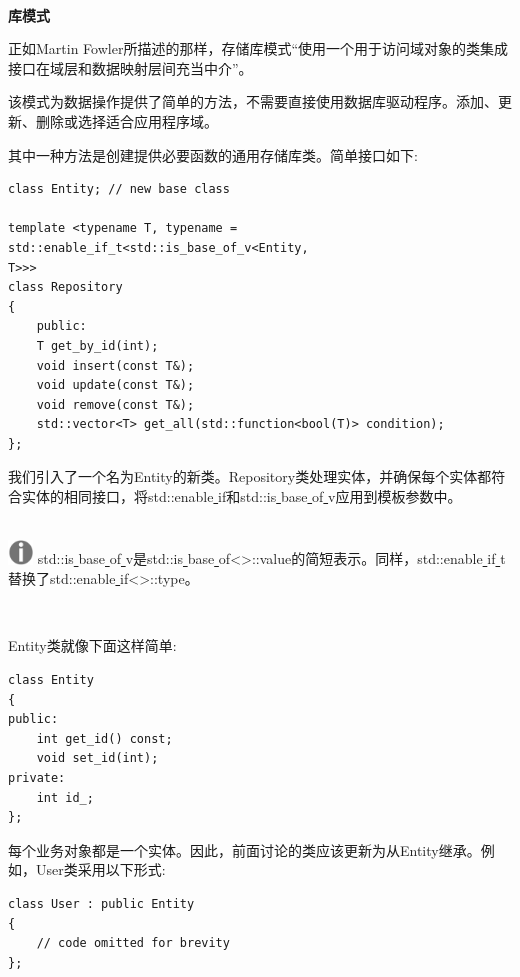 \noindent\textbf{}\ \par
\textbf{库模式} \ \par
正如Martin Fowler所描述的那样，存储库模式“使用一个用于访问域对象的类集成接口在域层和数据映射层间充当中介”。 \par
该模式为数据操作提供了简单的方法，不需要直接使用数据库驱动程序。添加、更新、删除或选择适合应用程序域。 \par
其中一种方法是创建提供必要函数的通用存储库类。简单接口如下: \par

\begin{lstlisting}[caption={}]
class Entity; // new base class

template <typename T, typename = std::enable_if_t<std::is_base_of_v<Entity,
T>>>
class Repository
{
	public:
	T get_by_id(int);
	void insert(const T&);
	void update(const T&);
	void remove(const T&);
	std::vector<T> get_all(std::function<bool(T)> condition);
};
\end{lstlisting}

我们引入了一个名为Entity的新类。Repository类处理实体，并确保每个实体都符合实体的相同接口，将std::enable\underline{ }if和std::is\underline{ }base\underline{ }of\underline{ }v应用到模板参数中。 \par

\hspace*{\fill} \\ %
\includegraphics[width=0.05\textwidth]{images/warn}
std::is\underline{ }base\underline{ }of\underline{ }v是std::is\underline{ }base\underline{ }of<>::value的简短表示。同样，std::enable\underline{ }if\underline{ }t替换了std::enable\underline{ }if<>::type。 \par
\noindent\textbf{}\ \par

Entity类就像下面这样简单: \par

\begin{lstlisting}[caption={}]
class Entity
{
public:
	int get_id() const;
	void set_id(int);
private:
	int id_;
};
\end{lstlisting}

每个业务对象都是一个实体。因此，前面讨论的类应该更新为从Entity继承。例如，User类采用以下形式: \par

\begin{lstlisting}[caption={}]
class User : public Entity
{
	// code omitted for brevity
};
\end{lstlisting}

